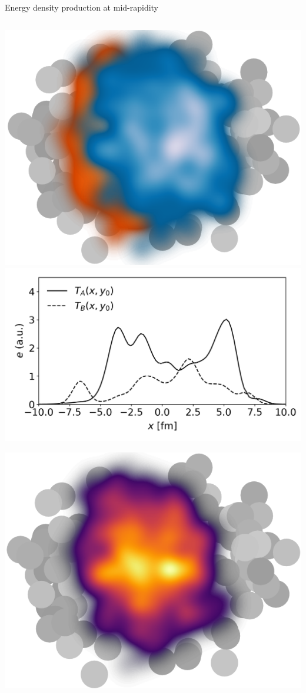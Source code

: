 \documentclass[11pt, aspectratio=169]{beamer}
\begin{document}
\begin{frame}{Energy density production at mid-rapidity}
\begin{columns}
\begin{column}{.35\textwidth}
\begin{overprint}
\begin{center}
\includegraphics[width=.7\textwidth]{Npart-density.png}\\
\includegraphics[width=\textwidth]{trento_p_tatb.png}
\end{center}
\begin{center}
\includegraphics[width=.7\textwidth]{s-density.png}\\

\end{center}
\end{overprint}
\end{column}
\end{columns}
\end{frame}
\end{document}
